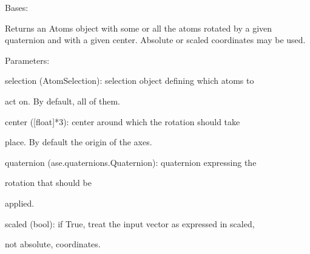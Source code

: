 \documentclass[letterpaper,10pt,english]{sphinxmanual}
\begin{document}

\begin{fulllineitems}
\label{doctree/soprano.properties.transform.transform:soprano.properties.transform.transform.Rotate}
Bases: {\hyperref[doctree/soprano.properties.atomsproperty:soprano.properties.atomsproperty.AtomsProperty]{}}

Returns an Atoms object with some or all the atoms rotated by a given
quaternion and with a given center. Absolute or scaled coordinates may be
used.

\begin{DUlineblock}{0em}
\item[] Parameters:
\item[]
\begin{DUlineblock}{\DUlineblockindent}
\item[] selection (AtomSelection): selection object defining which atoms to
\item[]
\begin{DUlineblock}{\DUlineblockindent}
\item[] act on. By default, all of them.
\end{DUlineblock}
\item[] center ({[}float{]}*3): center around which the rotation should take
\item[]
\begin{DUlineblock}{\DUlineblockindent}
\item[] place. By default the origin of the axes.
\end{DUlineblock}
\item[] quaternion (ase.quaternions.Quaternion): quaternion expressing the
\item[]
\begin{DUlineblock}{\DUlineblockindent}
\item[] rotation that should be
\item[] applied.
\end{DUlineblock}
\item[] scaled (bool): if True, treat the input vector as expressed in scaled,
\item[]
\begin{DUlineblock}{\DUlineblockindent}
\item[] not absolute, coordinates.
\end{DUlineblock}
\end{DUlineblock}
\end{DUlineblock}


\end{fulllineitems}
\end{document}
